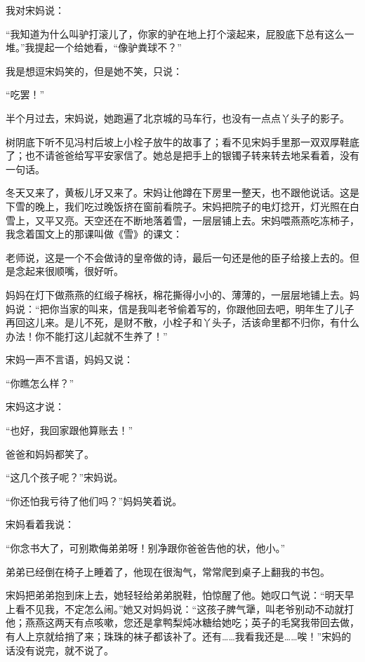 \par 我对宋妈说：
\par “我知道为什么叫驴打滚儿了，你家的驴在地上打个滚起来，屁股底下总有这么一堆。”我提起一个给她看，“像驴粪球不？”
\par 我是想逗宋妈笑的，但是她不笑，只说：
\par “吃罢！”
\par 半个月过去，宋妈说，她跑遍了北京城的马车行，也没有一点点丫头子的影子。
\par 树阴底下听不见冯村后坡上小栓子放牛的故事了；看不见宋妈手里那一双双厚鞋底了；也不请爸爸给写平安家信了。她总是把手上的银镯子转来转去地呆看着，没有一句话。
\par 冬天又来了，黄板儿牙又来了。宋妈让他蹲在下房里一整天，也不跟他说话。这是下雪的晚上，我们吃过晚饭挤在窗前看院子。宋妈把院子的电灯捻开，灯光照在白雪上，又平又亮。天空还在不断地落着雪，一层层铺上去。宋妈喂燕燕吃冻柿子，我念着国文上的那课叫做《雪》的课文：
\par 老师说，这是一个不会做诗的皇帝做的诗，最后一句还是他的臣子给接上去的。但是念起来很顺嘴，很好听。
\par 妈妈在灯下做燕燕的红缎子棉袄，棉花撕得小小的、薄薄的，一层层地铺上去。妈妈说：“把你当家的叫来，信是我叫老爷偷着写的，你跟他回去吧，明年生了儿子再回这儿来。是儿不死，是财不散，小栓子和丫头子，活该命里都不归你，有什么办法！你不能打这儿起就不生养了！”
\par 宋妈一声不言语，妈妈又说：
\par “你瞧怎么样？”
\par 宋妈这才说：
\par “也好，我回家跟他算账去！”
\par 爸爸和妈妈都笑了。
\par “这几个孩子呢？”宋妈说。
\par “你还怕我亏待了他们吗？”妈妈笑着说。
\par 宋妈看着我说：
\par “你念书大了，可别欺侮弟弟呀！别净跟你爸爸告他的状，他小。”
\par 弟弟已经倒在椅子上睡着了，他现在很淘气，常常爬到桌子上翻我的书包。
\par 宋妈把弟弟抱到床上去，她轻轻给弟弟脱鞋，怕惊醒了他。她叹口气说：“明天早上看不见我，不定怎么闹。”她又对妈妈说：“这孩子脾气犟，叫老爷别动不动就打他；燕燕这两天有点咳嗽，您还是拿鸭梨炖冰糖给她吃；英子的毛窝我带回去做，有人上京就给捎了来；珠珠的袜子都该补了。还有……我看我还是……唉！”宋妈的话没有说完，就不说了。
